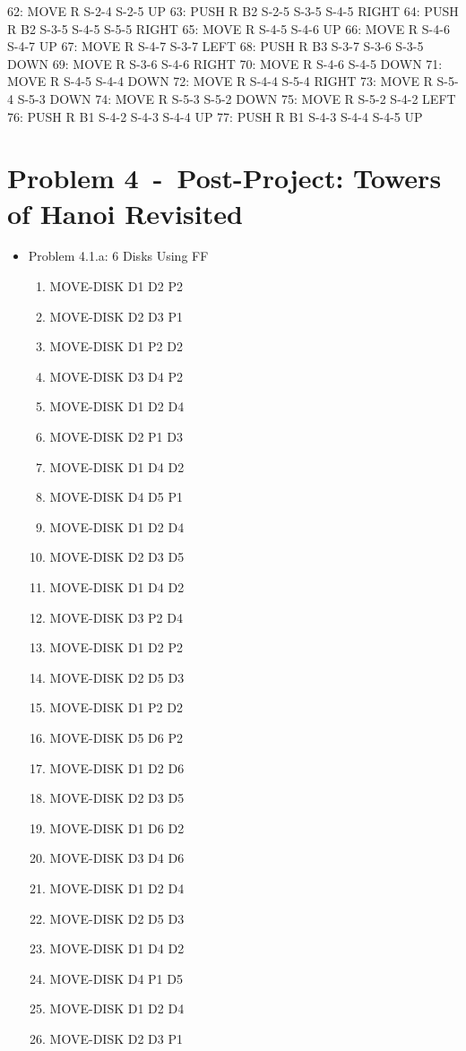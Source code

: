 \documentclass[12pt]{article}
\newcommand{\problem}[2]{\section*{Problem {#1}~-~{#2}}}
\begin{document}
\begin{appendix}
\begin{itemize}
       62: MOVE R S-2-4 S-2-5 UP
       63: PUSH R B2 S-2-5 S-3-5 S-4-5 RIGHT
       64: PUSH R B2 S-3-5 S-4-5 S-5-5 RIGHT
       65: MOVE R S-4-5 S-4-6 UP
       66: MOVE R S-4-6 S-4-7 UP
       67: MOVE R S-4-7 S-3-7 LEFT
       68: PUSH R B3 S-3-7 S-3-6 S-3-5 DOWN
       69: MOVE R S-3-6 S-4-6 RIGHT
       70: MOVE R S-4-6 S-4-5 DOWN
       71: MOVE R S-4-5 S-4-4 DOWN
       72: MOVE R S-4-4 S-5-4 RIGHT
       73: MOVE R S-5-4 S-5-3 DOWN
       74: MOVE R S-5-3 S-5-2 DOWN
       75: MOVE R S-5-2 S-4-2 LEFT
       76: PUSH R B1 S-4-2 S-4-3 S-4-4 UP
       77: PUSH R B1 S-4-3 S-4-4 S-4-5 UP
  \end{itemize}
\problem{4}{Post-Project: Towers of Hanoi Revisited}
  \begin{itemize}
    \item Problem 4.1.a: 6 Disks Using FF
	\begin{enumerate}
	\item  MOVE-DISK D1 D2 P2
	\item  MOVE-DISK D2 D3 P1
	\item  MOVE-DISK D1 P2 D2
	\item  MOVE-DISK D3 D4 P2
	\item  MOVE-DISK D1 D2 D4
	\item  MOVE-DISK D2 P1 D3
	\item  MOVE-DISK D1 D4 D2
	\item  MOVE-DISK D4 D5 P1
	\item  MOVE-DISK D1 D2 D4
	\item  MOVE-DISK D2 D3 D5
	\item  MOVE-DISK D1 D4 D2
	\item  MOVE-DISK D3 P2 D4
	\item  MOVE-DISK D1 D2 P2
	\item  MOVE-DISK D2 D5 D3
	\item  MOVE-DISK D1 P2 D2
	\item  MOVE-DISK D5 D6 P2
	\item  MOVE-DISK D1 D2 D6
	\item  MOVE-DISK D2 D3 D5
	\item  MOVE-DISK D1 D6 D2
	\item  MOVE-DISK D3 D4 D6
	\item  MOVE-DISK D1 D2 D4
	\item  MOVE-DISK D2 D5 D3
	\item  MOVE-DISK D1 D4 D2
	\item  MOVE-DISK D4 P1 D5
	\item  MOVE-DISK D1 D2 D4
	\item  MOVE-DISK D2 D3 P1

\end{enumerate}
\end{itemize}
\end{appendix}
\end{document}
